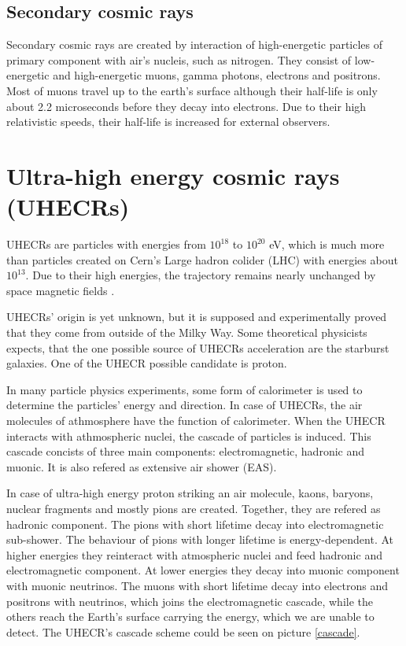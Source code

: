 \subsection{Secondary cosmic rays}
Secondary cosmic rays are created by interaction of high-energetic particles of primary component with air's nucleis, such as nitrogen. They consist of low-energetic and high-energetic muons, gamma photons, electrons and positrons. Most of muons travel up to the earth's surface although their half-life is only about 2.2 microseconds before they decay into electrons. Due to their high relativistic speeds, their half-life is increased for external observers. 




\section{Ultra-high energy cosmic rays (UHECRs)}
UHECRs are particles with energies from $10^{18}$ to $10^{20}$ eV, which is much more than particles created on Cern's Large hadron colider (LHC) with energies about $10^{13}$. Due to their high energies, the trajectory remains nearly unchanged by space magnetic fields \cite{Benjamin_Skuse}.
\par
UHECRs' origin is yet unknown, but it is supposed and experimentally proved that they come from outside of the Milky Way. Some theoretical physicists expects, that the one possible source of UHECRs acceleration are the starburst galaxies. One of the UHECR possible candidate is proton. 
\par
In many particle physics experiments, some form of calorimeter is used to determine the particles' energy and direction. In case of UHECRs, the air molecules of athmosphere have the function of calorimeter.
When the UHECR interacts with athmospheric nuclei, the cascade of particles is induced. This cascade concists of three main components: electromagnetic, hadronic and muonic. It is also refered as extensive air shower (EAS).
\par
In case of ultra-high energy proton striking an air molecule, kaons, baryons, nuclear fragments and mostly pions are created. Together, they are refered as hadronic component. The pions with short lifetime decay into electromagnetic sub-shower. The behaviour of pions with longer lifetime is energy-dependent. At higher energies they reinteract with atmospheric nuclei and feed hadronic and electromagnetic component. At lower energies they decay into muonic component with muonic neutrinos. The muons with short lifetime decay into electrons and positrons with neutrinos, which joins the electromagnetic cascade, while the others reach the Earth's surface carrying the energy, which we are unable to detect. The UHECR's cascade scheme could be seen on picture \ref{cascade}. 
